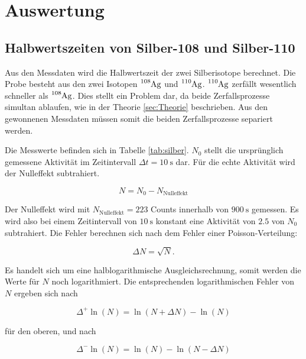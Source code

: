 \section{Auswertung}
\label{sec:Auswertung}

\subsection{Halbwertszeiten von Silber-108 und Silber-110}
\label{sec:Silberhalbwertszeit}

Aus den Messdaten wird die Halbwertszeit der zwei Silberisotope berechnet.
Die Probe besteht aus den zwei Isotopen $\ce{^{108}Ag}$ und $\ce{^{110}Ag}$.
$\ce{^{110}Ag}$ zerfällt wesentlich schneller als $\ce{^{108}Ag}$.
Dies stellt ein Problem dar, da beide Zerfallsprozesse simultan ablaufen, wie in der Theorie \ref{sec:Theorie} beschrieben.
Aus den gewonnenen Messdaten müssen somit die beiden Zerfallsprozesse separiert werden.

Die Messwerte befinden sich in Tabelle \ref{tab:silber}.
$N_0$ stellt die ursprünglich gemessene Aktivität im Zeitintervall $\Delta t = \SI{10}{\second}$ dar.
Für die echte Aktivität wird der Nulleffekt subtrahiert.

\begin{equation}
  N = N_0 - N_{\text{Nulleffekt}}
  \label{eqn:nulleffekt}
\end{equation}

Der Nulleffekt wird mit $N_\text{Nulleffekt} = 223$ Counts innerhalb von $\SI{900}{\second}$ gemessen.
Es wird also bei einem Zeitintervall von $\SI{10}{\second}$ konstant eine Aktivität von $2.5$ von $N_0$ subtrahiert.
Die Fehler berechnen sich nach dem Fehler einer Poisson-Verteilung:

\begin{equation}
  \Delta N = \sqrt{N}.
  \label{eqn:Poisson}
\end{equation}

Es handelt sich um eine halblogarithmische Ausgleichsrechnung, somit werden die Werte für $N$ noch logarithmiert.
Die entsprechenden logarithmischen Fehler von $N$ ergeben sich nach

\begin{equation}
  \Delta^{+} \ln(N) = \ln(N + \Delta N) - \ln(N)
  \label{eqn:oben}
\end{equation}

für den oberen, und nach

\begin{equation}
  \Delta^{-} \ln(N) = \ln(N) - \ln(N - \Delta N)
  \label{eqn:unten}
\end{equation}

